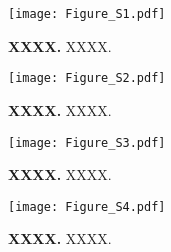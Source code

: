 \documentclass[10pt,oneside,a4paper]{article}
\begin{document}

\begin{figure}[H]
    \texttt{[image: Figure\_S1.pdf]}
	\caption{\scriptsize{\textbf{XXXX.}
XXXX.}}
\label{FigureS1}
\end{figure}

\begin{figure}[H]
    \texttt{[image: Figure\_S2.pdf]}
	\caption{\scriptsize{\textbf{XXXX.}
XXXX.}}
\label{FigureS2}
\end{figure}

\begin{SCfigure}[][h]
\texttt{[image: Figure\_S3.pdf]}
	\caption{\scriptsize{\textbf{XXXX.}
XXXX.}}
\label{FigureS3}
\end{SCfigure}

\bigskip\bigskip

\begin{SCfigure}[][h]
\texttt{[image: Figure\_S4.pdf]}
	\caption{\scriptsize{\textbf{XXXX.}
XXXX.}}
\label{FigureS4}
\end{SCfigure}
\end{document}
